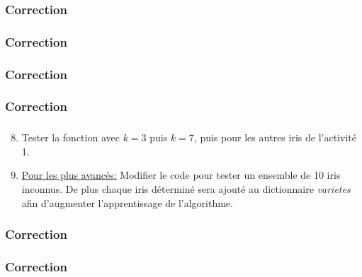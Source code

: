 \documentclass[svgnames,11pt]{beamer}
\begin{document}
\begin{frame}
    \frametitle{Correction}

    

\end{frame}
\begin{frame}
    \frametitle{Correction}

    

\end{frame}
\begin{frame}
    \frametitle{Correction}

    

\end{frame}
\begin{frame}
    \frametitle{Correction}

    

\end{frame}
\begin{frame}
    \frametitle{}
    \setcounter{compteuractivite}{2}

    \begin{activite}

        \begin{enumerate}
            \setcounter{enumi}{7}

            \item Tester la fonction avec $k=3$ puis $k=7$, puis pour les autres iris de l'activité 1.
            \item \underline{Pour les plus avancés:} Modifier le code pour tester un ensemble de 10 iris inconnus. De plus chaque iris déterminé sera ajouté au dictionnaire \emph{varietes} afin d'augmenter l'apprentissage de l'algorithme.
        \end{enumerate}
    \end{activite}

\end{frame}
\begin{frame}
    \frametitle{Correction}

    

\end{frame}
\begin{frame}
    \frametitle{Correction}

    

\end{frame}
\end{document}

